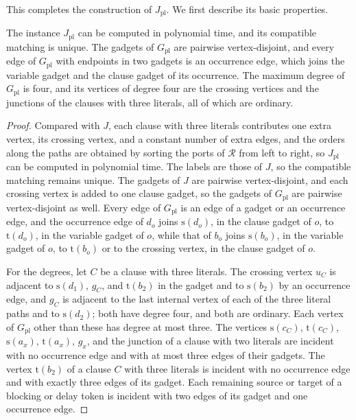 \documentclass[a4paper,USenglish,thm-restate]{lipics-v2021}
\newcommand{\src}{\mathrm{s}}
\newcommand{\tgt}{\mathrm{t}}
\theoremstyle{problemstyle}
\begin{document}
This completes the construction of $J_{\mathrm{pl}}$. We first describe its basic properties.

\begin{lemma}\label{lem:planar-construction-properties}
The instance $J_{\mathrm{pl}}$ can be computed in polynomial time, and its
compatible matching is unique. The gadgets of $G_{\mathrm{pl}}$ are pairwise
vertex-disjoint, and every edge of $G_{\mathrm{pl}}$ with endpoints in two
gadgets is an occurrence edge, which joins the variable gadget and the
clause gadget of its occurrence. The maximum degree of $G_{\mathrm{pl}}$ is
four, and its vertices of degree four are the crossing vertices and the
junctions of the clauses with three literals, all of which are ordinary.
\end{lemma}

\begin{proof}
Compared with $J$, each clause with three literals contributes one extra
vertex, its crossing vertex, and a constant number of extra edges, and the
orders along the paths are obtained by sorting the ports of $\mathcal{R}$
from left to right, so $J_{\mathrm{pl}}$ can be computed in polynomial time.
The labels are those of $J$, so the compatible matching remains unique.
The gadgets of $J$ are pairwise vertex-disjoint, and each crossing vertex
is added to one clause gadget, so the gadgets of $G_{\mathrm{pl}}$ are
pairwise vertex-disjoint as well. Every edge of $G_{\mathrm{pl}}$ is an
edge of a gadget or an occurrence edge, and the occurrence edge of $d_o$
joins $\src(d_o)$, in the clause gadget of $o$, to $\tgt(d_o)$, in the
variable gadget of $o$, while that of $b_o$ joins $\src(b_o)$, in the
variable gadget of $o$, to $\tgt(b_o)$ or to the crossing vertex, in the
clause gadget of $o$.

For the degrees, let $C$ be a clause with three literals. The crossing
vertex $u_C$ is adjacent to $\src(d_1)$, $g_C$, and $\tgt(b_2)$ in the
gadget and to $\src(b_2)$ by an occurrence edge, and $g_C$ is adjacent to
the last internal vertex of each of the three literal paths and to
$\src(d_2)$; both have degree four, and both are ordinary. Each vertex of
$G_{\mathrm{pl}}$ other than these has degree at most three. The vertices
$\src(c_C)$, $\tgt(c_C)$, $\src(a_x)$, $\tgt(a_x)$, $g_x$, and the junction
of a clause with two literals are incident with no occurrence edge and with
at most three edges of their gadgets. The vertex $\tgt(b_2)$ of a clause
$C$ with three literals is incident with no occurrence edge and with
exactly three edges of its gadget. Each remaining source or target of a
blocking or delay token is incident with two edges of its gadget and one
occurrence edge.
\end{proof}
\end{document}
